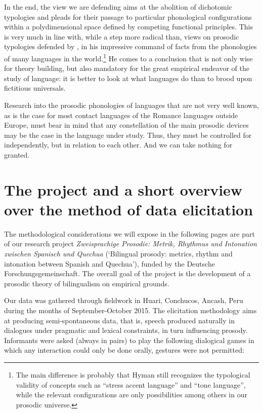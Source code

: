 \documentclass[output=paper]{LSP/langsci}
\begin{document}
In the end, the view we are defending aims at the abolition of dichotomic typologies and pleads for their passage to particular phonological configurations within a polydimensional space defined by competing functional principles. This is very much in line with, while a step more radical than, views on prosodic typologies defended by \citet{Hyman2009,Hyman2014}, in his impressive command of facts from the phonologies of many languages in the world.\footnote{The main difference is probably that Hyman still recognizes the typological validity of concepts such as ``stress accent language'' and ``tone language'', while the relevant configurations are only possibilities among others in our prosodic universe.} He comes to a conclusion that is not only wise for theory building, but also mandatory for the great empirical endeavor of the study of language: it is better to look at what languages do than to brood upon fictitious universals. 

Research into the prosodic phonologies of languages that are not very well known, as is the case for most contact languages of the Romance languages outside Europe, must bear in mind that any constellation of the main prosodic devices may be the case in the language under study. Thus, they must be controlled for independently, but in relation to each other. And we can take nothing for granted. 

\section{The project and a short overview over the method of data elicitation}

The methodological considerations we will expose in the following pages are part of our research project \textit{Zweisprachige Prosodie: Metrik, Rhythmus und Intonation zwischen Spanisch und Quechua} (`Bilingual prosody: metrics, rhythm and intonation between Spanish and Quechua'), funded by the Deutsche Forschungsgemeinschaft. The overall goal of the project is the development of a prosodic theory of bilingualism on empirical grounds.

Our data was gathered through fieldwork in Huari, Conchucos, Ancash, Peru during the months of September-October 2015. The elicitation methodology aims at producing semi-spontaneous data, that is, speech produced naturally in dialogues under pragmatic and lexical constraints, in turn influencing prosody. Informants were asked (always in pairs) to play the following dialogical games in which any interaction could only be done orally, gestures were not permitted:
\end{document}
